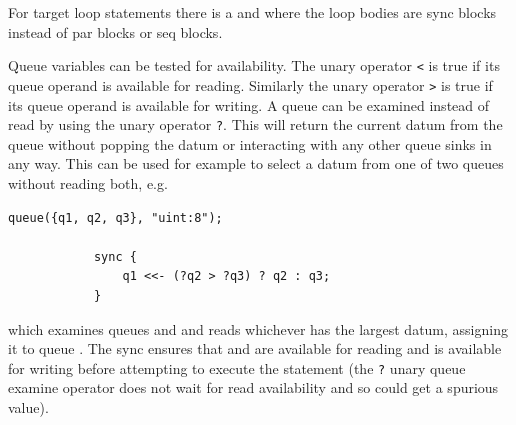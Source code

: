         For target loop statements there is a  and 
        where the loop bodies are sync blocks instead of par blocks or seq blocks.

        Queue variables can be tested for availability. The unary operator \verb'<'
        is true if its queue operand is available for reading. Similarly the unary
        operator \verb'>' is true if its queue operand is available for writing. A
        queue can be examined instead of read by using the unary operator \verb'?'.
        This will return the current datum from the queue without popping the datum
        or interacting with any other queue sinks in any way. This can be used for
        example to select a datum from one of two queues without reading both, e.g.
        \begin{lstlisting}[language=threepl]
            queue({q1, q2, q3}, "uint:8");

            sync {
                q1 <<- (?q2 > ?q3) ? q2 : q3;
            }
        \end{lstlisting}
        which examines queues  and  and reads whichever has the largest
        datum,  assigning it to queue . The sync ensures that  and
         are available for reading and  is available for writing
        before attempting to execute the statement (the \verb'?' unary queue examine
        operator does not wait for read availability and so could get a spurious
        value).

